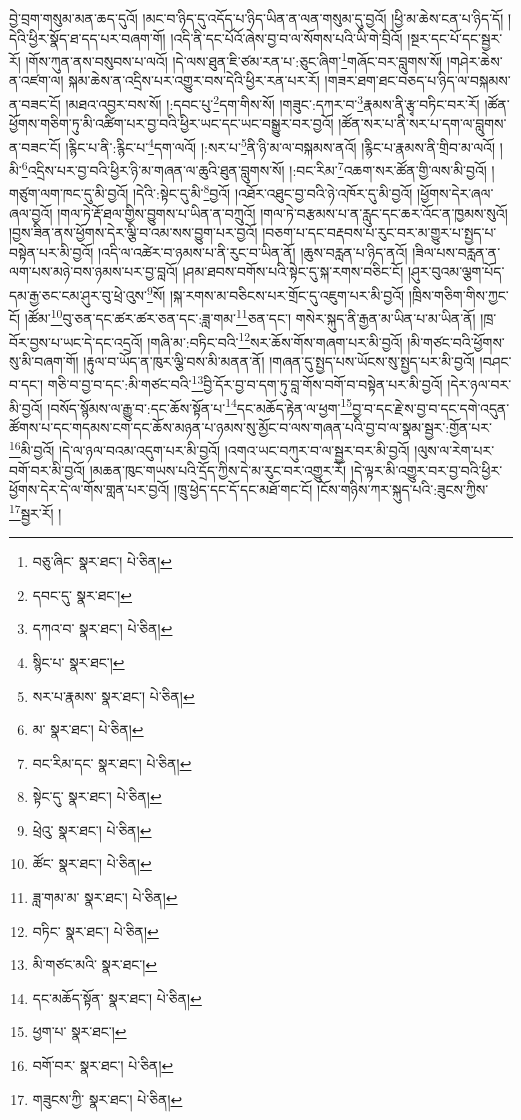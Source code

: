 བྱེ་བྲག་གསུམ་མན་ཆད་དུའོ། །མང་བ་ཉིད་དུ་འདོད་པ་ཉིད་ཡིན་ན་ལན་གསུམ་དུ་བྱའོ། །ཕྱི་མ་ཆེས་ངན་པ་ཉིད་དོ། །དེའི་ཕྱིར་སྣོད་ཐ་དད་པར་བཞག་གོ། །འདི་ནི་དང་པོའོ་ཞེས་བྱ་བ་ལ་སོགས་པའི་ཡི་གེ་བྲིའོ། །སྔར་དང་པོ་དང་སྦྱར་རོ། །གོས་ཀུན་ནས་བསུབས་པ་ལའོ། །དེ་ལས་ཐུན་ཇི་ཙམ་རན་པ་:ཅུང་ཞིག་\footnote{བཅུ་ཞིང་  སྣར་ཐང་།  པེ་ཅིན། }གཞོང་བར་བླུགས་སོ། །གཤེར་ཆེས་ན་འཛག་ལ། སྐམ་ཆེས་ན་འདྲིས་པར་འགྱུར་བས་དེའི་ཕྱིར་རན་པར་རོ། །གཟར་ཐག་ཐང་བཅད་པ་ཉིད་ལ་བསྐམས་ན་བཟང་ངོ། །མཐའ་འབྱར་བས་སོ། །:དབང་པུ་\footnote{དབང་དུ་  སྣར་ཐང་། }དག་གིས་སོ། །གཟུང་:དཀར་བ་\footnote{དཀའ་བ་  སྣར་ཐང་།  པེ་ཅིན། }རྣམས་ནི་རྩྭ་བཏིང་བར་རོ། །ཚོན་ཕྱོགས་གཅིག་ཏུ་མི་འཚིག་པར་བྱ་བའི་ཕྱིར་ཡང་དང་ཡང་བསྒྱུར་བར་བྱའོ། །ཚོན་སར་པ་ནི་སར་པ་དག་ལ་བླུགས་ན་བཟང་ངོ། །རྙིང་པ་ནི་:རྙིང་པ་\footnote{སྙིང་པ་  སྣར་ཐང་། }དག་ལའོ། །:སར་པ་\footnote{སར་པ་རྣམས་  སྣར་ཐང་།  པེ་ཅིན། }ནི་ཉི་མ་ལ་བསྐམས་ནའོ། །རྙིང་པ་རྣམས་ནི་གྲིབ་མ་ལའོ། །མི་\footnote{མ་  སྣར་ཐང་།  པེ་ཅིན། }འདྲིས་པར་བྱ་བའི་ཕྱིར་ཉི་མ་གཞན་ལ་ཆུའི་ཐུན་བླུགས་སོ། །:བང་རིམ་\footnote{བང་རིམ་དང་  སྣར་ཐང་།  པེ་ཅིན། }འཆག་སར་ཚོན་གྱི་ལས་མི་བྱའོ། །གཙུག་ལག་ཁང་དུ་མི་བྱའོ། །དེའི་:སྟེང་དུ་མི་\footnote{སྟེང་དུ་  སྣར་ཐང་།  པེ་ཅིན། }བྱའོ། །འཐོར་འཐུང་བྱ་བའི་ཉེ་འཁོར་དུ་མི་བྱའོ། །ཕྱོགས་དེར་ཞལ་ཞལ་བྱའོ། །གལ་ཏེ་རྡོ་ཐལ་གྱིས་བྱུགས་པ་ཡིན་ན་བཀྲུའོ། །གལ་ཏེ་བརྩམས་པ་ན་རླུང་དང་ཆར་འོང་ན་ཁྱམས་སུའོ། །བྱས་ཟིན་ནས་ཕྱོགས་དེར་ལྕི་བ་འམ་སས་བྱུག་པར་བྱའོ། །བཅག་པ་དང་བརྡབས་པ་རུང་བར་མ་གྱུར་པ་སྤྱད་པ་བསྟེན་པར་མི་བྱའོ། །འདི་ལ་འཚེར་བ་ཉམས་པ་ནི་རུང་བ་ཡིན་ནོ། །ཆུས་བརླན་པ་ཉིད་ནའོ། །ཟིལ་པས་བརླན་ན་ལག་པས་མཉེ་བས་ཉམས་པར་བྱ་བླའོ། །ཤམ་ཐབས་བགོས་པའི་སྟེང་དུ་སྐ་རགས་བཅིང་ངོ། །ཤུར་བུའམ་ལྕག་པོད་དམ་རྒྱ་ཅང་ངམ་ཤུར་བུ་ཕྲེ་འུས་\footnote{ཕྲེའུ་  སྣར་ཐང་།  པེ་ཅིན། }སོ། །སྐ་རགས་མ་བཅིངས་པར་གྲོང་དུ་འཇུག་པར་མི་བྱའོ། །ཁྲིས་གཅིག་གིས་ཀྱང་ངོ། །ཚོམ་\footnote{ཚོང་  སྣར་ཐང་།  པེ་ཅིན། }བུ་ཅན་དང་ཚར་ཚར་ཅན་དང་:ཟླ་གམ་\footnote{ཟླ་གམ་མ་  སྣར་ཐང་།  པེ་ཅིན། }ཅན་དང་། གསེར་སྐུད་ནི་རྒྱན་མ་ཡིན་པ་མ་ཡིན་ནོ། །ཁྲ་བོར་བྱས་པ་ཡང་དེ་དང་འདྲའོ། །གཞི་མ་:བཏིང་བའི་\footnote{བཏིང་  སྣར་ཐང་།  པེ་ཅིན། }སར་ཆོས་གོས་གཞག་པར་མི་བྱའོ། །མི་གཙང་བའི་ཕྱོགས་སུ་མི་བཞག་གོ། །རྟུལ་བ་ཡོད་ན་ཁུར་ལྕི་བས་མི་མནན་ནོ། །གཞན་དུ་སྤྱད་པས་ཡོངས་སུ་སྤྱད་པར་མི་བྱའོ། །བཤང་བ་དང་། གཅི་བ་བྱ་བ་དང་:མི་གཙང་བའི་\footnote{མི་གཙང་མའི་  སྣར་ཐང་། }བྱི་དོར་བྱ་བ་དག་ཏུ་བླ་གོས་བགོ་བ་བསྟེན་པར་མི་བྱའོ། །དེར་ཉལ་བར་མི་བྱའོ། །བསོད་སྙོམས་ལ་རྒྱུ་བ་:དང་ཆོས་སྟོན་པ་\footnote{དང་མཆོད་སྟོན་  སྣར་ཐང་།  པེ་ཅིན། }དང་མཆོད་རྟེན་ལ་ཕྱག་\footnote{ཕྱག་པ་  སྣར་ཐང་། }བྱ་བ་དང་རྗེ་ས་བྱ་བ་དང་དགེ་འདུན་ཚོགས་པ་དང་གདམས་ངག་དང་ཆོས་མཉན་པ་ཉམས་སུ་མྱོང་བ་ལས་གཞན་པའི་བྱ་བ་ལ་སྣམ་སྦྱར་:གྱོན་པར་\footnote{བགོ་བར་  སྣར་ཐང་།  པེ་ཅིན། }མི་བྱའོ། །དེ་ལ་ཉལ་བའམ་འདུག་པར་མི་བྱའོ། །འགའ་ཡང་བཀུར་བ་ལ་སྦྱར་བར་མི་བྱའོ། །ལུས་ལ་རེག་པར་བགོ་བར་མི་བྱའོ། །མཆན་ཁུང་གཡས་པའི་དྲོད་ཀྱིས་དེ་མ་རུང་བར་འགྱུར་རོ། །དེ་ལྟར་མི་འགྱུར་བར་བྱ་བའི་ཕྱིར་ཕྱོགས་དེར་དེ་ལ་གོས་གླན་པར་བྱའོ། །ཁྲུ་ཕྱེད་དང་དོ་དང་མཐོ་གང་ངོ། །ངོས་གཉིས་ཀར་སྐུད་པའི་:ཟུངས་ཀྱིས་\footnote{གཟུངས་ཀྱི་  སྣར་ཐང་།  པེ་ཅིན། }སྦྱར་རོ། །
